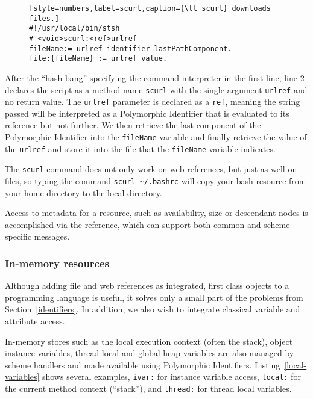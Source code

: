 \documentclass[preprint,authoryear]{llncs}
\begin{document}
\begin{figure}[htbp]
\begin{lstlisting}[style=numbers,label=scurl,caption={\tt scurl} downloads files.]
#!/usr/local/bin/stsh
#-<void>scurl:<ref>urlref
fileName:= urlref identifier lastPathComponent.
file:{fileName} := urlref value.
\end{lstlisting}
\end{figure}

After the ``hash-bang'' specifying the command interpreter in the first line, line 2 declares
the script as a method name {\tt scurl} with the single argument {\tt urlref} and no return
value.  The {\tt urlref} parameter is declared as a {\tt ref}, meaning the string passed will
be interpreted as a Polymorphic Identifier that is evaluated to its reference but not further.
We then retrieve the last component of the Polymorphic Identifier into the {\tt fileName}
variable and finally retrieve the value of the {\tt urlref} and store it into the file that
the {\tt fileName} variable indicates.

The {\tt scurl} command does not only work on web references, but just as well
on files, so typing the command {\tt scurl \~\//.bashrc} will copy your bash resource from your home directory
to the local directory.

Access to metadata for a resource, such as availability, size or descendant nodes
is accomplished via the reference, which can support both common and scheme-specific
messages.

\subsubsection{In-memory resources}
\label{inmemory}

Although adding file and web references as integrated, first class objects to a programming
language is useful, it solves only a small part of the problems from Section~\ref{identifiers}.
In addition, we also wish to integrate classical variable and attribute access.

In-memory stores such as the local execution context (often the stack), object instance
variables, thread-local and global heap variables are also managed by scheme handlers
and made available using Polymorphic Identifiers.  Listing~\ref{local-variables} shows
several examples, {\tt ivar:} for instance variable access, {\tt local:} for the current
method context (``stack''), and {\tt thread:} for thread local variables.
\end{document}
